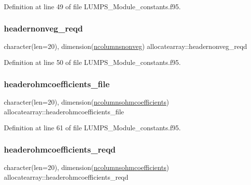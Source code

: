 Definition at line 49 of file L\+U\+M\+P\+S\+\_\+\+Module\+\_\+constants.\+f95.

\mbox{\label{namespaceallocatearray_a13ad90de9ec05be3e8fcce9b8dd62155}} 
\subsubsection{\texorpdfstring{headernonveg\+\_\+reqd}{headernonveg\_reqd}}
{\footnotesize\ttfamily character(len=20), dimension(\hyperlink{namespaceallocatearray_a820ebcf66504982dee392a9c3a224fe2}{ncolumnsnonveg}) allocatearray\+::headernonveg\+\_\+reqd}



Definition at line 50 of file L\+U\+M\+P\+S\+\_\+\+Module\+\_\+constants.\+f95.

\mbox{\label{namespaceallocatearray_ab57027814b6b042a4069c3a133738d76}} 
\subsubsection{\texorpdfstring{headerohmcoefficients\+\_\+file}{headerohmcoefficients\_file}}
{\footnotesize\ttfamily character(len=20), dimension(\hyperlink{namespaceallocatearray_a290704d8211d9850cffa53e494c6821e}{ncolumnsohmcoefficients}) allocatearray\+::headerohmcoefficients\+\_\+file}



Definition at line 61 of file L\+U\+M\+P\+S\+\_\+\+Module\+\_\+constants.\+f95.

\mbox{\label{namespaceallocatearray_a7a6f653f2a1b5e347b03dd6b859f1ff5}} 
\subsubsection{\texorpdfstring{headerohmcoefficients\+\_\+reqd}{headerohmcoefficients\_reqd}}
{\footnotesize\ttfamily character(len=20), dimension(\hyperlink{namespaceallocatearray_a290704d8211d9850cffa53e494c6821e}{ncolumnsohmcoefficients}) allocatearray\+::headerohmcoefficients\+\_\+reqd}



